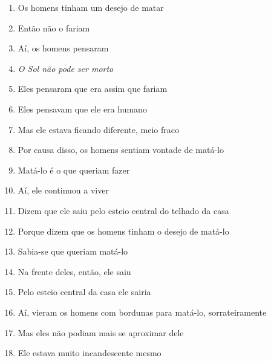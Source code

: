 \begin{enumerate}
\begin{center}\end{center}

\item Os homens tinham um desejo de matar
\item Então não o fariam
\item Aí, os homens pensaram
\item \textit{O Sol não pode ser morto}

\begin{center}\end{center}

\item Eles pensaram que era assim que fariam
\item Eles pensavam que ele era humano
\item Mas ele estava ficando diferente, meio fraco

\begin{center}\end{center}

\item Por causa disso, os homens sentiam vontade de matá-lo
\item Matá-lo é o que queriam fazer
\item Aí, ele continuou a viver

\begin{center}\end{center}

\item Dizem que ele saiu pelo esteio central do telhado da casa
\item Porque dizem que os homens tinham o desejo de matá-lo
\item Sabia-se que queriam matá-lo

\begin{center}\end{center}

\item Na frente deles, então, ele saiu
\item Pelo esteio central da casa ele sairia
\item Aí, vieram os homens com bordunas para matá-lo, sorrateiramente
\item Mas eles não podiam mais se aproximar dele
\item Ele estava muito incandescente mesmo

\begin{center}\end{center}


\end{enumerate}
